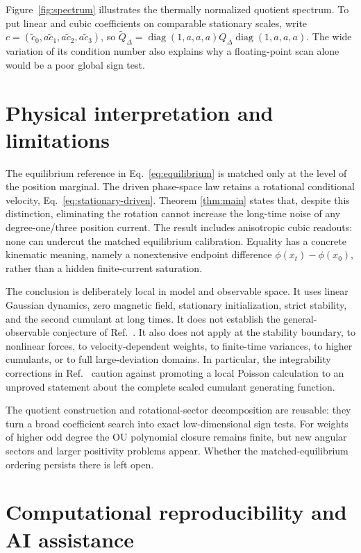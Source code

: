 \documentclass[aps,pre,reprint,amsmath,amssymb,superscriptaddress,nofootinbib]{revtex4-2}
\begin{document}
Figure~\ref{fig:spectrum} illustrates the thermally normalized quotient
spectrum.  To put linear and cubic coefficients on comparable stationary
scales, write $c=(\widetilde c_0,a\widetilde c_1,
a\widetilde c_2,a\widetilde c_3)$, so
$\widetilde Q_\Delta=\operatorname{diag}(1,a,a,a)Q_\Delta
\operatorname{diag}(1,a,a,a)$.  The wide variation of its condition number
also explains why a floating-point scan alone would be a poor global sign
test.

\section{Physical interpretation and limitations}
\label{sec:discussion}

The equilibrium reference in Eq.~\eqref{eq:equilibrium} is matched only at the
level of the position marginal.  The driven phase-space law retains a
rotational conditional velocity, Eq.~\eqref{eq:stationary-driven}.  Theorem
\ref{thm:main} states that, despite this distinction, eliminating the rotation
cannot increase the long-time noise of any degree-one/three position current.
The result includes anisotropic cubic readouts: none can undercut the matched
equilibrium calibration.  Equality has a concrete kinematic meaning, namely a
nonextensive endpoint difference $\phi(x_t)-\phi(x_0)$, rather than a hidden
finite-current saturation.

The conclusion is deliberately local in model and observable space.  It uses
linear Gaussian dynamics, zero magnetic field, stationary initialization,
strict stability, and the second cumulant at long times.  It does not establish
the general-observable conjecture of Ref.~\cite{Dechant2022}.  It also does not
apply at the stability boundary, to nonlinear forces, to velocity-dependent
weights, to finite-time variances, to higher cumulants, or to full
large-deviation domains.  In particular, the integrability corrections in
Ref.~\cite{duBuissonTouchette2025Erratum} caution against promoting a local
Poisson calculation to an unproved statement about the complete scaled
cumulant generating function.

The quotient construction and rotational-sector decomposition are reusable:
they turn a broad coefficient search into exact low-dimensional sign tests.
For weights of higher odd degree the OU polynomial closure remains finite, but
new angular sectors and larger positivity problems appear.  Whether the
matched-equilibrium ordering persists there is left open.

\section{Computational reproducibility and AI assistance}
\label{sec:reproducibility}
\end{document}
